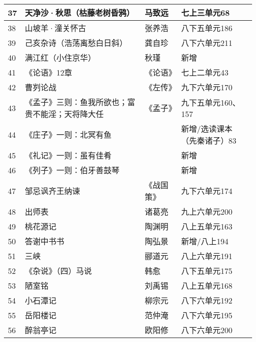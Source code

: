 \documentclass[12pt]{ctexart}
\begin{document}
\begin{longtable}{@{}llll@{}}
    37  & 天净沙·秋思（枯藤老树昏鸦）            & 马致远    & 七上三单元68         \\* \midrule
    38  & 山坡羊·潼关怀古                  & 张养浩    & 八下五单元186        \\* \midrule
    39  & 己亥杂诗（浩荡离愁白日斜）             & 龚自珍    & 八下六单元211        \\* \midrule
    40  & 满江红（小住京华）                 & 秋瑾     & 新增              \\* \midrule
    41  & 《论语》12章                   & 《论语》   & 七上二单元43         \\* \midrule
    42  & 曹刿论战                      & 《左传》   & 九下六单元170        \\* \midrule
    43  & 《孟子》三则：鱼我所欲也；富贵不能淫；天将降大任  & 《孟子》   & 九下五单元160、157    \\* \midrule
    44  & 《庄子》一则：北冥有鱼               &        & 新增/选读课本（先秦诸子）83 \\* \midrule
    45  & 《礼记》一则：虽有佳肴               &        & 新增              \\* \midrule
    46  & 《列子》一则：伯牙善鼓琴              &        & 新增              \\* \midrule
    47  & 邹忌讽齐王纳谏                   & 《战国策》  & 九下六单元174        \\* \midrule
    48  & 出师表                       & 诸葛亮    & 九上六单元200        \\* \midrule
    49  & 桃花源记                      & 陶渊明    & 八上五单元163        \\* \midrule
    50  & 答谢中书书                     & 陶弘景    & 新增/八上194        \\* \midrule
    51  & 三峡                        & 郦道元    & 八上六单元191        \\* \midrule
    52  & 《杂说》（四）马说                 & 韩愈     & 八下五单元175        \\* \midrule
    53  & 陋室铭                       & 刘禹锡    & 八上五单元168        \\* \midrule
    54  & 小石潭记                      & 柳宗元    & 八下六单元192        \\* \midrule
    55  & 岳阳楼记                      & 范仲淹    & 八下六单元195        \\* \midrule
    56  & 醉翁亭记                      & 欧阳修    & 八下六单元200        \\* \midrule

\end{longtable}
\end{document}

